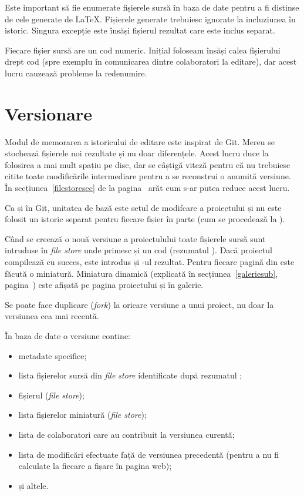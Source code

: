 \documentclass[a4wide,12pt]{report}
\newcommand{\eng}[1]{\emph{#1}} %
\newcommand{\acr}[1]{{\textsmaller[1]{\textsc{#1}}}} %
\begin{document}
Este important să fie enumerate fișierele sursă în baza de date pentru a fi
distinse de cele generate de \LaTeX{}. Fișierele generate trebuiesc ignorate la
incluziunea în istoric. Singura excepție este însăși fișierul \acr{PDF} rezultat
care este inclus separat.

Fiecare fișier sursă are un cod numeric. Inițial foloseam însăși calea
fișierului drept cod (spre exemplu în comunicarea dintre colaboratori la
editare), dar acest lucru cauzează probleme la redenumire.

\section{Versionare}

Modul de memorarea a istoricului de editare este inspirat de Git. Mereu se
stochează fișierele noi rezultate și nu doar diferențele. Acest lucru duce la
folosirea a mai mult spațiu pe disc, dar se câștigă viteză pentru că nu
trebuiesc citite toate modificările intermediare pentru a se reconstrui o
anumită versiune. În secțiunea~\ref{filestoresec} de la
pagina~\pageref{filestoresec} arăt cum s-ar putea reduce acest lucru.

Ca și în Git, unitatea de bază este setul de modifcare a proiectului și nu este
folosit un istoric separat pentru fiecare fișier în parte (cum se procedează la
\acr{SVN}).

Când se creează o nouă versiune a proiectulului toate fișierele sursă sunt
intruduse în \eng{file store} unde primesc și un cod (rezumatul \acr{SHA1}).
Dacă proiectul compilează cu succes, este introdus și \acr{PDF}-ul rezultat.
Pentru fiecare pagină din \acr{PDF} este făcută o miniatură. Miniatura dinamică
(explicată în secțiunea~\ref{galeriesub}, pagina~\pageref{galeriesub}) este
afișată pe pagina proiectului și în galerie.

Se poate face duplicare (\eng{fork}) la oricare versiune a unui proiect, nu doar
la versiunea cea mai recentă.

În baza de date o versiune conține:

\begin{itemize}

\item metadate specifice;

\item lista fișierelor sursă din \eng{file store} identificate după rezumatul
\acr{SHA1};

\item fișierul \acr{PDF} (\eng{file store});

\item lista fișierelor miniatură (\eng{file store});

\item lista de colaboratori care au contribuit la versiunea curentă;

\item lista de modificări efectuate față de versiunea precedentă (pentru a nu fi
calculate la fiecare a fișare în pagina web);

\item și altele.

\end{itemize}
\end{document}
